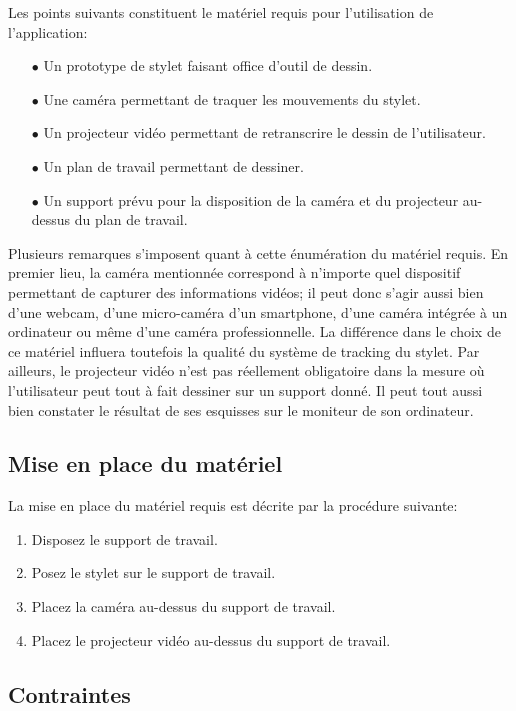 \documentclass[11pt,a4paper,oldfontcommands]{memoir}
\begin{document}
Les points suivants constituent le matériel requis pour l'utilisation de l'application:

\begin{itemize}
\item[$\bullet$] Un prototype de stylet faisant office d'outil de dessin.
\item[$\bullet$] Une caméra permettant de traquer les mouvements du stylet. 
\item[$\bullet$] Un projecteur vidéo permettant de retranscrire le dessin de l'utilisateur.
\item[$\bullet$] Un plan de travail permettant de dessiner.
\item[$\bullet$] Un support prévu pour la disposition de la caméra et du projecteur au-dessus du plan de travail.
\end{itemize}

Plusieurs remarques s'imposent quant à cette énumération du matériel requis. En premier lieu, la caméra mentionnée correspond à n'importe quel dispositif permettant de capturer des informations vidéos; il peut donc s'agir aussi bien d'une webcam, d'une micro-caméra d'un smartphone, d'une caméra intégrée à un ordinateur ou même d'une caméra professionnelle. La différence dans le choix de ce matériel influera toutefois la qualité du système de tracking du stylet. Par ailleurs, le projecteur vidéo n'est pas réellement obligatoire dans la mesure où l'utilisateur peut tout à fait dessiner sur un support donné. Il peut tout aussi bien constater le résultat de ses esquisses sur le moniteur de son ordinateur.

\subsection{Mise en place du matériel}

La mise en place du matériel requis est décrite par la procédure suivante:

\begin{enumerate}
\item Disposez le support de travail.
\item Posez le stylet sur le support de travail.
\item Placez la caméra au-dessus du support de travail.
\item Placez le projecteur vidéo au-dessus du support de travail.
\end{enumerate}

\subsection{Contraintes}
\end{document}

